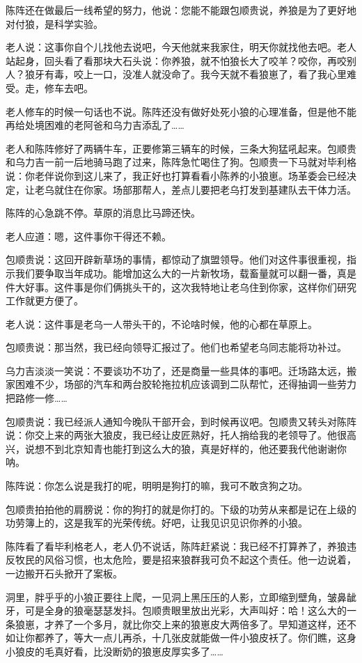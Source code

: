 \par 陈阵还在做最后一线希望的努力，他说：您能不能跟包顺贵说，养狼是为了更好地对付狼，是科学实验。
\par 老人说：这事你自个儿找他去说吧，今天他就来我家住，明天你就找他去吧。老人站起身，回头看了看那块大石头说：你养狼，就不怕狼长大了咬羊？咬你，再咬别人？狼牙有毒，咬上一口，没准人就没命了。我今天就不看狼崽了，看了我心里难受。走，修车去吧。
\par 老人修车的时候一句话也不说。陈阵还没有做好处死小狼的心理准备，但是他不能再给处境困难的老阿爸和乌力吉添乱了……
\par 
\par 老人和陈阵修好了两辆牛车，正要修第三辆车的时候，三条大狗猛吼起来。包顺贵和乌力吉一前一后地骑马跑了过来，陈阵急忙喝住了狗。包顺贵一下马就对毕利格说：你老伴说你到这儿来了，我正好也打算看看小陈养的小狼崽。场革委会已经决定，让老乌就住在你家。场部那帮人，差点儿要把老乌打发到基建队去干体力活。
\par 陈阵的心急跳不停。草原的消息比马蹄还快。
\par 老人应道：嗯，这件事你干得还不赖。
\par 包顺贵说：这回开辟新草场的事情，都惊动了旗盟领导。他们对这件事很重视，指示我们要争取当年成功。能增加这么大的一片新牧场，载畜量就可以翻一番，真是件大好事。这件事是你们俩挑头干的，这次我特地让老乌住到你家，这样你们研究工作就更方便了。
\par 老人说：这件事是老乌一人带头干的，不论啥时候，他的心都在草原上。
\par 包顺贵说：那当然，我已经向领导汇报过了。他们也希望老乌同志能将功补过。
\par 乌力吉淡淡一笑说：不要谈功不功了，还是商量一些具体的事吧。迁场路太远，搬家困难不少，场部的汽车和两台胶轮拖拉机应该调到二队帮忙，还得抽调一些劳力把路修一修……
\par 包顺贵说：我已经派人通知今晚队干部开会，到时候再议吧。包顺贵又转头对陈阵说：你交上来的两张大狼皮，我已经让皮匠熟好，托人捎给我的老领导了。他很高兴，说想不到北京知青也能打到这么大的狼，真是好样的，他还要我代他谢谢你呐。
\par 陈阵说：你怎么说是我打的呢，明明是狗打的嘛，我可不敢贪狗之功。
\par 包顺贵拍拍他的肩膀说：你的狗打的就是你打的。下级的功劳从来都是记在上级的功劳簿上的，这是我军的光荣传统。好吧，让我见识见识你养的小狼。
\par 陈阵看了看毕利格老人，老人仍不说话，陈阵赶紧说：我已经不打算养了，养狼违反牧民的风俗习惯，也太危险，要是招来狼群我可负不起这个责任。他一边说着，一边搬开石头掀开了案板。
\par 洞里，胖乎乎的小狼正要往上爬，一见洞上黑压压的人影，立即缩到壁角，皱鼻龇牙，可是全身的狼毫瑟瑟发抖。包顺贵眼里放出光彩，大声叫好：哈！这么大的一条狼崽，才养了一个多月，就比你交上来的狼崽皮大两倍多了。早知道这样，还不如让你都养了，等大一点儿再杀，十几张皮就能做一件小狼皮袄了。你们瞧，这身小狼皮的毛真好看，比没断奶的狼崽皮厚实多了……
